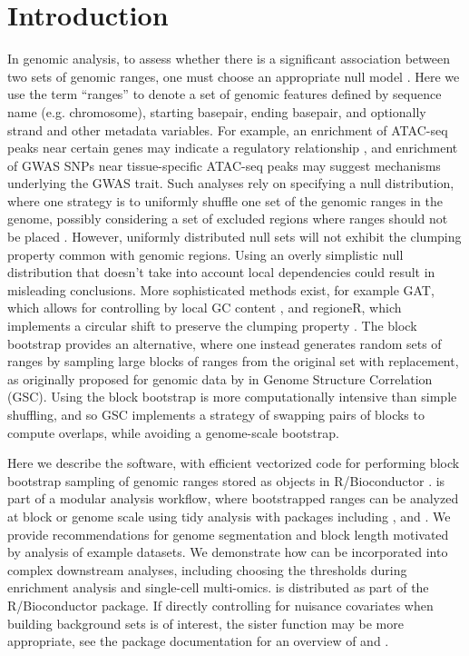 \section{Introduction}

In genomic analysis, to assess whether
there is a significant association between two sets of genomic ranges, 
one must choose an appropriate null model \citep{reviewdilemma2014,kanduri2018}.
Here we use the term ``ranges'' to denote a set of genomic features defined by sequence name (e.g. chromosome), starting basepair, ending basepair, and optionally strand and other metadata variables.
For example, an enrichment of ATAC-seq peaks near certain genes
may indicate a regulatory relationship \citep{lee2020fluent}, 
and enrichment of GWAS SNPs near tissue-specific ATAC-seq peaks may
suggest mechanisms underlying the GWAS trait.
Such analyses rely on specifying a null distribution, where one
strategy is to uniformly shuffle one set of the
genomic ranges in the genome, possibly considering a set of
excluded regions where ranges should not be placed \citep{excluderanges}.
However, uniformly distributed null sets will not exhibit the
clumping property common with genomic regions.
Using an overly simplistic null distribution that doesn't take into
account local dependencies could result in misleading conclusions.
More sophisticated methods exist, for example
GAT, which allows for controlling by local GC content
\citep{GAT_2013}, and regioneR, which implements a circular shift to
preserve the clumping property \citep{gel2016regioner}.
The block bootstrap \citep{politis1999subsampling}
provides an alternative, where one instead generates
random sets of ranges by sampling large blocks of ranges from the
original set with replacement, as originally proposed for 
genomic data by \citet{bickel2010subsampling} in Genome Structure
Correlation (GSC).
Using the block bootstrap is more
computationally intensive than simple shuffling, and so GSC implements
a strategy of swapping pairs of blocks to compute overlaps, while
avoiding a genome-scale bootstrap.

Here we describe the \bootranges software, with efficient
vectorized code for performing block bootstrap sampling of genomic ranges
stored as \granges objects in R/Bioconductor
\citep{lawrence2013software}.
\bootranges is part of a modular analysis workflow, where bootstrapped
ranges can be analyzed at block or genome scale using tidy
analysis with packages including \plyranges \citep{lee2019plyranges},
and \tidybulk \citep{mangiola2021tidybulk}.
We provide recommendations for genome segmentation and block length
motivated by analysis of example datasets.
We demonstrate how \bootranges can be incorporated into complex
downstream analyses, including choosing the thresholds during
enrichment analysis and single-cell multi-omics.
\bootranges is distributed as part of the \nullranges R/Bioconductor package.
If directly controlling for nuisance covariates when building
background sets is of interest, the sister function \matchranges \citep{Davis2022matchranges}
may be more appropriate, see the package documentation for an overview of
\bootranges and \matchranges.

